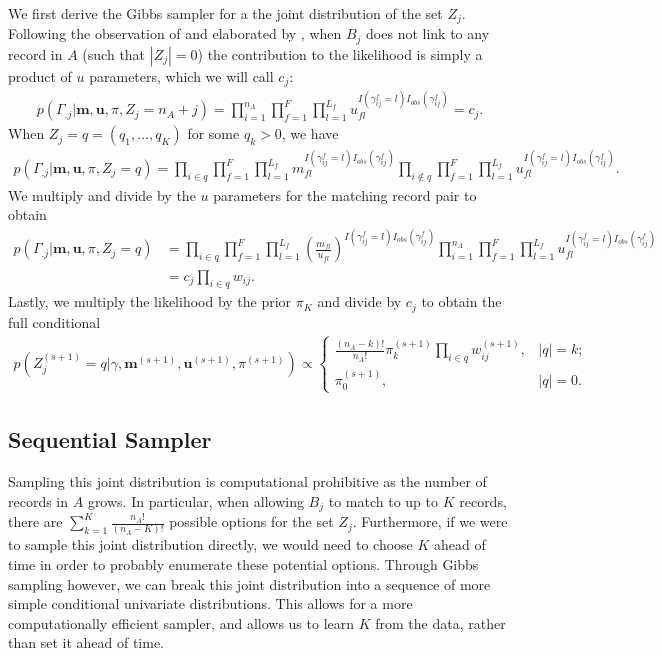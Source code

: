 \documentclass[12pt,letterpaper]{article}
\newcommand{\1}[1]{\mathbb{I}\!\left[#1\right]} %
\begin{document}
We first derive the Gibbs sampler for a the joint distribution of the set $Z_j$. Following the observation of \cite{wortman2019} and elaborated by \cite{kundinger_2023}, when $B_j$ does not link to any record in $A$ (such that $|Z_j| = 0$) the contribution to the likelihood is simply a product of $u$ parameters, which we will call $c_j$:
\begin{align}
	p(\Gamma_{.j}| \bm{m}, \bm{u}, \pi, Z_j = n_A + j) = \prod_{i=1}^{n_A}\prod_{f=1}^{F}\prod_{l=1}^{L_f} u_{fl}^{I(\gamma_{ij}^f = l)I_{obs}(\gamma_{ij}^f)} = c_j.
\end{align}
When $Z_j = q =  (q_1, \ldots, q_K)$ for some $q_k > 0$, we have
\begin{align}
	p(\Gamma_{.j}| \bm{m}, \bm{u}, \pi,  Z_j = q) =\prod_{i \in q}\prod_{f=1}^{F}\prod_{l=1}^{L_f} m_{fl}^{I(\gamma_{ij}^f = l)I_{obs}(\gamma_{ij}^f)}  \prod_{i \notin q}\prod_{f=1}^{F}\prod_{l=1}^{L_f} u_{fl}^{I(\gamma_{ij}^f = l)I_{obs}(\gamma_{ij}^f)}.
\end{align}
We multiply and divide by the $u$ parameters for the matching record pair to obtain
\begin{align}
	p(\Gamma_{.j}| \bm{m}, \bm{u}, \pi, Z_j = q) &= \prod_{i \in q}\prod_{f=1}^{F}\prod_{l=1}^{L_f} \left(\frac{m_{fl}}{u_{fl}}\right)^{I(\gamma_{ij}^f = l)I_{obs}(\gamma_{ij}^f)}  \prod_{i = 1}^{n_A}\prod_{f=1}^{F}\prod_{l=1}^{L_f} u_{fl}^{I(\gamma_{ij}^f = l)I_{obs}(\gamma_{ij}^f)} \\
	&= c_j \prod_{i \in q} w_{ij} .
\end{align}
Lastly, we multiply the likelihood by the prior $\pi_K$ and divide by $c_j$ to obtain the full conditional
\begin{align}
	\label{eqn:joint_posterior}
	p\left(Z_j^{(s+1)}  = q|\gamma, \bm{m}^{(s+1)}, \bm{u}^{(s+1)}, \pi^{(s+1)}\right) \propto
	\begin{cases} 
		\frac{(n_A - k)!}{n_A!} \pi_k^{(s+1)} \prod_{i \in q} w_{ij}^{(s+1)},  & |q| = k ; \\
		\pi_0^{(s+1)}, & |q| = 0.
	\end{cases}
\end{align}

\subsection{Sequential Sampler}\label{sec:sequential-sampler}
Sampling this joint distribution is computational prohibitive as the number of records in $A$ grows. In particular, when allowing $B_j$ to match to up to $K$ records, there are $\sum_{k = 1}^K \frac{n_A!}{(n_A - K)!}$ possible options for the set $Z_j$. Furthermore, if we were to sample this joint distribution directly, we would need to choose $K$ ahead of time in order to probably enumerate these potential options. Through Gibbs sampling however, we can break this joint distribution into a sequence of more simple conditional univariate distributions. This allows for a more computationally efficient sampler, and allows us to learn $K$ from the data, rather than set it ahead of time. 
\end{document}
